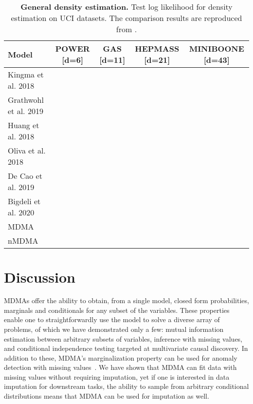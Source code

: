 \documentclass{article}
\begin{document}
\begin{table}[]
\caption{\textbf{General density estimation.} Test log likelihood for density estimation on UCI datasets. The comparison results are reproduced from \cite{bigdeli2020learning}.
}
\begin{tabular}{lcccc}
\toprule
Model  &   {\small POWER} {\footnotesize [d=6]}  &  {\small GAS} {\footnotesize [d=11]}           & {\small HEPMASS} {\footnotesize [d=21]}   & {\footnotesize MINIBOONE } {\footnotesize [d=43]}        \\ 
\hline
Kingma et al. 2018   \cite{kingma2018}      &  &             &          &           \\
Grathwohl et al. 2019     \cite{grathwohl2018ffjord}      &  &            &          &           \\
Huang et al. 2018         \cite{huang2018neural}          &  &           &           &            \\
Oliva et al. 2018         \cite{oliva2018transformation}  &  &  &          &           \\
De Cao et al. 2019 \cite{de2020block}                                         &  &  &          &            \\
Bigdeli et al. 2020 \cite{bigdeli2020learning}                                                  &  &           &  &  \\ \hline
MDMA       &                                          &                &                                       &                           \\
nMDMA                                            &                    &                          &                          &      
\\

\bottomrule
\end{tabular}
\label{tab:UCI}
\vspace{-.1in}
\end{table} 

\section{Discussion}
\label{sec:discussion}
MDMAs offer the ability to obtain, from a single model, closed form probabilities, marginals and conditionals for any subset of the variables. These properties enable one to straightforwardly use the model to solve a diverse array of problems, of which we have demonstrated only a few: mutual information estimation between arbitrary subsets of variables, inference with missing values, and conditional independence testing targeted at multivariate causal discovery. 
In addition to these, MDMA's marginalization property can be used for anomaly detection with missing values~\cite{dietterich2018anomaly}. We have shown that MDMA can fit data with missing values without requiring imputation, yet if one is interested in data imputation for downstream tasks, the ability to sample from arbitrary conditional distributions means that MDMA can be used for imputation as well. 
\end{document}
